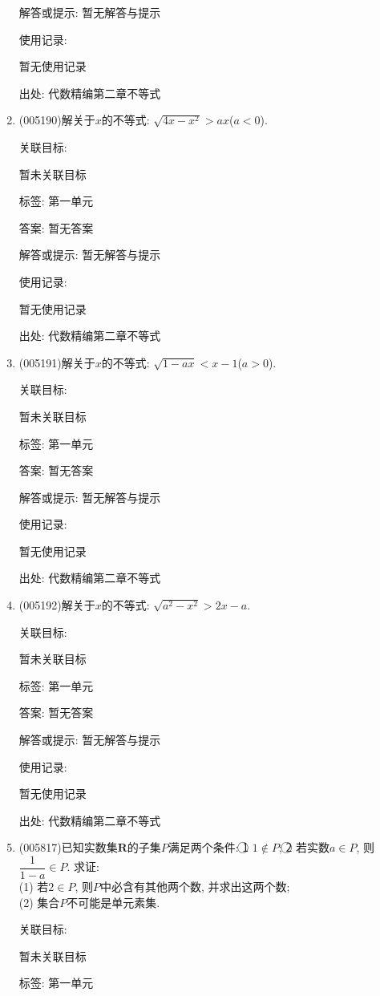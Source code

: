 \documentclass[10pt,a4paper]{article}
\begin{document}
\begin{enumerate}[1.]
解答或提示: 暂无解答与提示

使用记录:

暂无使用记录


出处: 代数精编第二章不等式
\item { (005190)}解关于$x$的不等式: $\sqrt{4x-x^2}>ax$($a<0$).


关联目标:

暂未关联目标



标签: 第一单元

答案: 暂无答案

解答或提示: 暂无解答与提示

使用记录:

暂无使用记录


出处: 代数精编第二章不等式
\item { (005191)}解关于$x$的不等式: $\sqrt{1-ax}<x-1$($a>0$).


关联目标:

暂未关联目标



标签: 第一单元

答案: 暂无答案

解答或提示: 暂无解答与提示

使用记录:

暂无使用记录


出处: 代数精编第二章不等式
\item { (005192)}解关于$x$的不等式: $\sqrt{a^2-x^2}>2x-a$.


关联目标:

暂未关联目标



标签: 第一单元

答案: 暂无答案

解答或提示: 暂无解答与提示

使用记录:

暂无使用记录


出处: 代数精编第二章不等式
\item { (005817)}已知实数集$\mathbf{R}$的子集$P$满足两个条件: \textcircled{1} $1\notin P$; \textcircled{2} 若实数$a\in P$, 则$\dfrac 1{1-a}\in P$. 求证:\\
(1) 若$2\in P$, 则$P$中必含有其他两个数, 并求出这两个数;\\
(2) 集合$P$不可能是单元素集.


关联目标:

暂未关联目标



标签: 第一单元


\end{enumerate}
\end{document}
